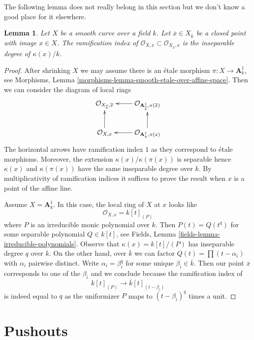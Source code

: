 \documentclass{stacks-project}
\theoremstyle{plain}
\newtheorem{lemma}[subsection]{Lemma}
\theoremstyle{definition}
\theoremstyle{remark}
\numberwithin{equation}{subsection}
\begin{document}
\noindent
The following lemma does not really belong in this section
but we don't know a good place for it elsewhere.

\begin{lemma}
\label{lemma-ramification-to-algebraic-closure}
Let $X$ be a smooth curve over a field $k$. Let
$\overline{x} \in X_{\overline{k}}$ be a closed
point with image $x \in X$. The ramification index of
$\mathcal{O}_{X, x} \subset \mathcal{O}_{X_{\overline{k}}, \overline{x}}$
is the inseparable degree of $\kappa(x)/k$.
\end{lemma}

\begin{proof}
After shrinking $X$ we may assume there is an \'etale morphism
$\pi : X \to \mathbf{A}^1_k$, see
Morphisms, Lemma \ref{morphisms-lemma-smooth-etale-over-affine-space}.
Then we can consider the diagram of local rings
$$
\xymatrix{
\mathcal{O}_{X_{\overline{k}}, \overline{x}} &
\mathcal{O}_{\mathbf{A}^1_{\overline{k}}, \pi(\overline{x})} \ar[l] \\
\mathcal{O}_{X, x} \ar[u] &
\mathcal{O}_{\mathbf{A}^1_k, \pi(x)} \ar[l] \ar[u]
}
$$
The horizontal arrows have ramification index $1$ as they correspond to
\'etale morphisms. Moreover, the extension $\kappa(x)/\kappa(\pi(x))$ is
separable hence $\kappa(x)$ and $\kappa(\pi(x))$ have the same
inseparable degree over $k$.
By multiplicativity of ramification indices it suffices to
prove the result when $x$ is a point of the affine line.

\medskip\noindent
Assume $X = \mathbf{A}^1_k$. In this case, the local ring of $X$ at $x$
looks like
$$
\mathcal{O}_{X, x} = k[t]_{(P)}
$$
where $P$ is an irreducible monic polynomial over $k$.
Then $P(t) = Q(t^q)$ for some separable polynomial $Q \in k[t]$, see
Fields, Lemma \ref{fields-lemma-irreducible-polynomials}.
Observe that $\kappa(x) = k[t]/(P)$ has inseparable degree $q$
over $k$. On the other hand, over $\overline{k}$ we can factor
$Q(t) = \prod (t - \alpha_i)$ with $\alpha_i$ pairwise distinct.
Write $\alpha_i = \beta_i^q$ for some unique $\beta_i \in \overline{k}$.
Then our point $\overline{x}$ corresponds to one of the $\beta_i$
and we conclude because the ramification index of
$$
k[t]_{(P)} \longrightarrow \overline{k}[t]_{(t - \beta_i)}
$$
is indeed equal to $q$ as the uniformizer $P$ maps to
$(t - \beta_i)^q$ times a unit.
\end{proof}





\section{Pushouts}
\label{section-pushouts}
\end{document}
